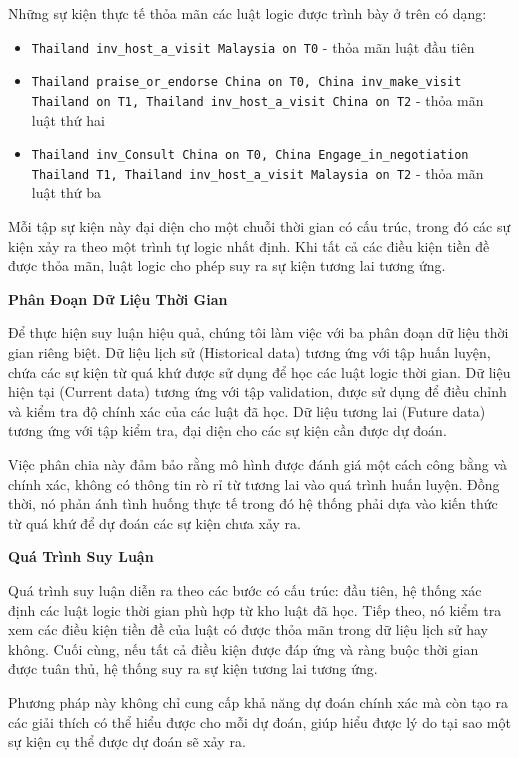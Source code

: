 Những sự kiện thực tế thỏa mãn các luật logic được trình bày ở trên có dạng:

\begin{itemize}
    \item \texttt{Thailand inv\_host\_a\_visit Malaysia on T0} - thỏa mãn luật đầu tiên
    \item \texttt{Thailand praise\_or\_endorse China on T0, China inv\_make\_visit Thailand on T1, Thailand inv\_host\_a\_visit China on T2} - thỏa mãn luật thứ hai
    \item \texttt{Thailand inv\_Consult China on T0, China Engage\_in\_negotiation Thailand T1, Thailand inv\_host\_a\_visit Malaysia on T2} - thỏa mãn luật thứ ba
\end{itemize}

Mỗi tập sự kiện này đại diện cho một chuỗi thời gian có cấu trúc, trong đó các sự kiện xảy ra theo một trình tự logic nhất định. Khi tất cả các điều kiện tiền đề được thỏa mãn, luật logic cho phép suy ra sự kiện tương lai tương ứng.

\textbf{Phân Đoạn Dữ Liệu Thời Gian}

Để thực hiện suy luận hiệu quả, chúng tôi làm việc với ba phân đoạn dữ liệu thời gian riêng biệt. Dữ liệu lịch sử (Historical data) tương ứng với tập huấn luyện, chứa các sự kiện từ quá khứ được sử dụng để học các luật logic thời gian. Dữ liệu hiện tại (Current data) tương ứng với tập validation, được sử dụng để điều chỉnh và kiểm tra độ chính xác của các luật đã học. Dữ liệu tương lai (Future data) tương ứng với tập kiểm tra, đại diện cho các sự kiện cần được dự đoán.

Việc phân chia này đảm bảo rằng mô hình được đánh giá một cách công bằng và chính xác, không có thông tin rò rỉ từ tương lai vào quá trình huấn luyện. Đồng thời, nó phản ánh tình huống thực tế trong đó hệ thống phải dựa vào kiến thức từ quá khứ để dự đoán các sự kiện chưa xảy ra.

\textbf{Quá Trình Suy Luận}

Quá trình suy luận diễn ra theo các bước có cấu trúc: đầu tiên, hệ thống xác định các luật logic thời gian phù hợp từ kho luật đã học. Tiếp theo, nó kiểm tra xem các điều kiện tiền đề của luật có được thỏa mãn trong dữ liệu lịch sử hay không. Cuối cùng, nếu tất cả điều kiện được đáp ứng và ràng buộc thời gian được tuân thủ, hệ thống suy ra sự kiện tương lai tương ứng.

Phương pháp này không chỉ cung cấp khả năng dự đoán chính xác mà còn tạo ra các giải thích có thể hiểu được cho mỗi dự đoán, giúp hiểu được lý do tại sao một sự kiện cụ thể được dự đoán sẽ xảy ra.


